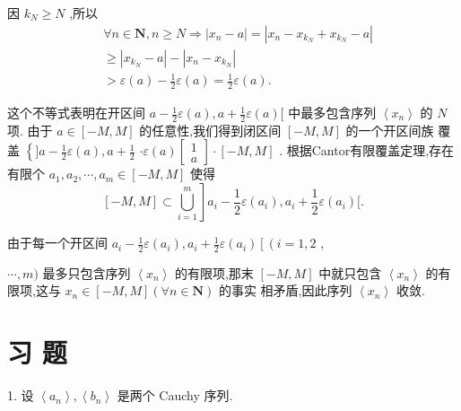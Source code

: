 因 ${k}_{N} \geq  N$ ,所以
\begin{align*}
	&\forall n \in  \mathbf{N},n \geq  N \Rightarrow  \left| {{x}_{n} - a}\right|  = \left| {{x}_{n} - {x}_{{k}_{N}} + {x}_{{k}_{N}} - a}\right|\\
	&\geq  \left| {{x}_{{k}_{N}} - a}\right|  - \left| {{x}_{n} - {x}_{{k}_{N}}}\right|\\
	&> \varepsilon \left( a\right)  - \frac{1}{2}\varepsilon \left( a\right)  = \frac{1}{2}\varepsilon \left( a\right) .
\end{align*}

这个不等式表明在开区间 $a - \frac{1}{2}\varepsilon \left( a\right) ,a + \frac{1}{2}\varepsilon \left( a\right) \lbrack$ 中最多包含序列 $\left\langle  {x}_{n}\right\rangle$ 的 $N$ 项. 由于 $a \in  \left\lbrack  {-M,M}\right\rbrack$ 的任意性,我们得到闭区间 $\left\lbrack  {-M,M}\right\rbrack$ 的一个开区间族 覆盖 $\left\{  {\rbrack a - \frac{1}{2}\varepsilon \left( a\right) ,a + \frac{1}{2}}\right.$  $\cdot  \varepsilon \left( a\right) \left\lbrack  \begin{array}{l} 1 \\  a \end{array}\right\rbrack   \cdot  \left\lbrack  {-M,M}\right\rbrack$ . 根据Cantor有限覆盖定理,存在有限个 ${a}_{1},{a}_{2},\cdots ,{a}_{m} \in  \left\lbrack  {-M,M}\right\rbrack$ 使得
$$\left. {\left\lbrack  {-M,M}\right\rbrack   \subset  \mathop{\bigcup }\limits_{{i = 1}}^{m}}\right\rbrack  {a}_{i} - \frac{1}{2}\varepsilon \left( {a}_{i}\right) ,{a}_{i} + \frac{1}{2}\varepsilon \left( {a}_{i}\right) \lbrack .$$

由于每一个开区间 ${a}_{i} - \frac{1}{2}\varepsilon \left( {a}_{i}\right) ,{a}_{i} + \frac{1}{2}\varepsilon \left( {a}_{i}\right) \left\lbrack  \left( {i = 1,2}\right. \right.$ ,

$\cdots ,m)$ 最多只包含序列 $\left\langle  {x}_{n}\right\rangle$ 的有限项,那末 $\left\lbrack  {-M,M}\right\rbrack$ 中就只包含 $\left\langle  {x}_{n}\right\rangle$ 的有限项,这与 ${x}_{n} \in  \left\lbrack  {-M,M}\right\rbrack  \left( {\forall n \in  \mathbf{N}}\right)$ 的事实 相矛盾,因此序列 $\left\langle  {x}_{n}\right\rangle$ 收敛.

\section*{习 题}

1. 设 $\left\langle  {a}_{n}\right\rangle  ,\left\langle  {b}_{n}\right\rangle$ 是两个 Cauchy 序列.

